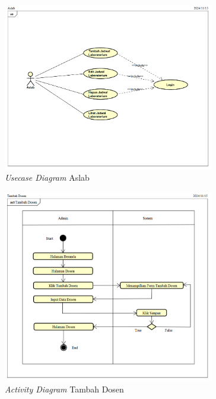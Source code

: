 \begin{figure}
	\centering
	\includegraphics[width=0.82\textwidth]{konten/gambar/usecase-diagram/aslab.png}
	\caption{\textit{Usecase Diagram} Aslab}
	\label{usecase-diagram-aslab}
\end{figure}

\begin{figure}
	\centering
	\includegraphics[width=0.82\textwidth]{konten/gambar/activity-diagram/tambah-dosen.png}
	\caption{\textit{Activity Diagram} Tambah Dosen}
	\label{activity-diagram-tambah-dosen}
\end{figure}


